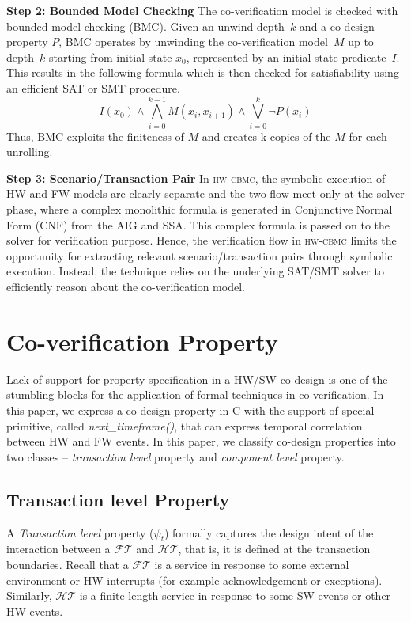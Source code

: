 \documentclass[sigconf]{acmart}
\newcommand{\tool}[1]{\textsc{#1}\xspace}
\newcommand{\hwcbmcv}{\tool{hw-cbmc}}
\newcommand{\Omit}[1]{}
\begin{document}
\textbf{Step 2: Bounded Model Checking}
%
The co-verification model is checked with bounded model checking (BMC).
Given an unwind depth~$k$ and a co-design property $P$, BMC operates
by unwinding the co-verification model~$M$ up to depth~$k$ starting from
initial state $x_0$, represented by an initial state predicate~$I$.
This results in the following formula which is then checked for
satisfiability using an efficient SAT or SMT procedure.
%
\[ I(x_0) \wedge \bigwedge_{i=0}^{k-1} M(x_i, x_{i+1}) \wedge \bigvee_{i=0}^{k} 
\neg P(x_i) \]
%
Thus, BMC exploits the finiteness of $M$ and creates k copies of the
$M$ for each unrolling. 



\textbf{Step 3: Scenario/Transaction Pair} In \hwcbmcv, the symbolic execution 
of HW and FW models are clearly separate and the two flow meet only at the
solver phase, where a complex monolithic formula is generated in 
Conjunctive Normal Form (CNF) from the AIG and SSA.  This complex formula 
is passed on to the solver for verification purpose.  
Hence, the verification flow in \hwcbmcv limits the opportunity for extracting 
relevant scenario/transaction pairs through symbolic execution.  Instead, the 
technique relies on the underlying SAT/SMT solver to efficiently reason about 
the co-verification model. 
%
\Omit{
The hardware and firmware run independently of each other. 
The communication between them takes place through these function calls. 
}
\section{Co-verification Property}\label{property}
Lack of support for property specification in a HW/SW co-design is one of the
stumbling blocks for the application of formal techniques in co-verification.  
In this paper, we express a co-design property in C 
with the support of special primitive, called {\em next\_timeframe()}, 
that can express temporal correlation between HW and FW events. 
In this paper, we classify co-design properties into two 
classes -- {\em transaction level} property and {\em component level} property.
\subsection{Transaction level Property}
A {\em Transaction level} property ($\psi_{t}$) formally captures the 
design intent of the interaction between a $\mathcal{FT}$ and $\mathcal{HT}$, 
that is, it is defined at the transaction boundaries.  
Recall that a $\mathcal{FT}$ is a service in response to some external environment 
or HW interrupts (for example acknowledgement or exceptions). Similarly, 
$\mathcal{HT}$ is a finite-length service in response to some SW events or 
other HW events. 
\end{document}
